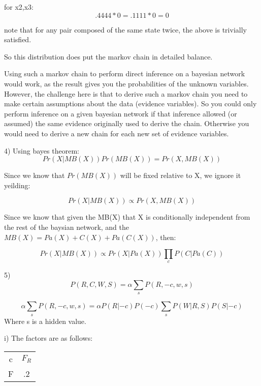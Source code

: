 \documentclass[12pt]{article}
\begin{document}
for x2,x3: 
\begin{equation}
     .4444*0 = .1111*0 = 0
\end{equation}

note that for any pair composed of the same state twice, the above is trivially satisfied. 

So this distribution does put the markov chain in detailed balance. 

Using such a markov chain to perform direct inference on a bayesian network would work, as the result 
gives you the probabilities of the unknown variables. However, the challenge here is that to derive such a 
markov chain you need to make certain assumptions about the data (evidence variables). So you could only 
perform inference on a given bayesian network if that inference allowed (or assumed) the same evidence 
originally used to derive the chain. Otherwise you would need to derive a new chain for each new set of 
evidence variables. 

\pagebreak
\setcounter{equation}{0}
4) Using bayes theorem:
\begin{equation}
    Pr(X|MB(X))Pr(MB(X)) = Pr(X,MB(X))
\end{equation}

Since we know that $Pr(MB(X))$ will be fixed relative to X, we ignore it yeilding: 

\begin{equation}
    Pr(X|MB(X)) \propto Pr(X,MB(X))
\end{equation}

Since we know that given the MB(X) that X is conditionally independent from the rest of 
the baysian network, and the $MB(X) = Pa(X) + C(X) + Pa(C(X))$, then: 

\begin{equation}
    Pr(X|MB(X)) \propto Pr(X|Pa(X))\prod_c P(C|Pa(C))
\end{equation}


\pagebreak
\setcounter{equation}{0}
5)
\begin{equation}
  P(R,C,W,S) = \alpha \sum_s P(R,-c,w,s) 
\end{equation}

\begin{equation}
  \alpha \sum_s P(R,-c,w,s) = \alpha P(R|-c)P(-c)\sum_s P(W|R,S)P(S|-c)
\end{equation}
Where s is a hidden value. 

i) The factors are as follows: 

\begin{table}[h!]
  \begin{tabular}{|c|c|}
    \hline
    c & $F_R$ \\
    F & .2 \\
    \hline 
  \end{tabular}
\end{table}
\end{document}
